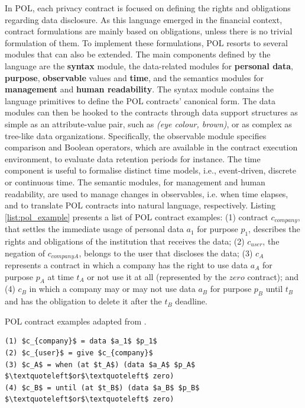 In POL, each privacy contract is focused on defining the rights and obligations regarding data disclosure.
As this language emerged in the financial context, contract formulations are mainly based on obligations, unless there is no trivial formulation of them.
To implement these formulations, POL resorts to several modules that can also be extended.
The main components defined by the language are the \textbf{syntax} module, the data-related modules for \textbf{personal data}, \textbf{purpose}, \textbf{observable} values and \textbf{time}, and the semantics modules  for \textbf{management} and \textbf{human readability}.
The syntax module contains the language primitives to define the POL contracts' canonical form. 
The data modules can then be hooked to the contracts through data support structures as simple as an attribute-value pair, such as \textit{(eye colour, brown)}, or as complex as tree-like data organizations.
Specifically, the observable module specifies comparison and Boolean operators, which are available in the contract execution environment, to evaluate data retention periods for instance.
The time component is useful to formalise distinct time models, i.e., event-driven, discrete or continuous time.
The semantic modules, for management and human readability, are used to manage changes in observables, i.e. when time elapses, and to translate POL contracts into natural language, respectively. 
Listing \ref{list:pol_example} presents a list of POL contract examples: (1) contract $c_{company}$, that settles the immediate usage of personal data $a_1$ for purpose $p_1$, describes the rights and obligations of the institution that receives the data; (2) $c_{user}$, the negation of $c_{companyA}$, belongs to the user that discloses the data; (3) $c_A$ represents a contract in which a company has the right to use data $a_A$ for purpose $p_A$ at time $t_A$ or not use it at all (represented by the $zero$ contract); and (4) $c_B$ in which a company may or may not use data $a_B$ for purpose $p_B$ until $t_B$ and has the obligation to delete it after the $t_B$ deadline.

\begin{listing}
\caption{POL contract examples adapted from \cite{berthold_towards_2011}.}
\label{list:pol_example}
\begin{verbatim}
(1) $c_{company}$ = data $a_1$ $p_1$
(2) $c_{user}$ = give $c_{company}$
(3) $c_A$ = when (at $t_A$) (data $a_A$ $p_A$ $\textquoteleft$or$\textquoteleft$ zero)
(4) $c_B$ = until (at $t_B$) (data $a_B$ $p_B$ $\textquoteleft$or$\textquoteleft$ zero) 
\end{verbatim}
\end{listing}

